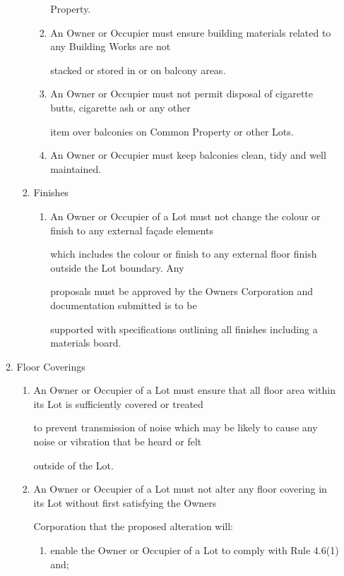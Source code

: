 \documentclass{article}
\begin{document}
\begin{enumerate}[label=\arabic*.]
\begin{enumerate}[label=\arabic{enumi}.\arabic*.]
\begin{enumerate}[label=(\arabic*)]
\begin{enumerate}[label=(\alph*)]
Property. 

\item  An Owner or Occupier must ensure building materials related to any Building Works are not 

stacked or stored in or on balcony areas. 

\item  An Owner or Occupier must not permit disposal of cigarette butts, cigarette ash or any other 

item over balconies on Common Property or other Lots. 

\item  An Owner or Occupier must keep balconies clean, tidy and well maintained. 

\end{enumerate}
\item  Finishes 

\begin{enumerate}[label=(\alph*)]
\item  An Owner or Occupier of a Lot must not change the colour or finish to any external façade elements 

which includes the colour or finish to any external floor finish outside the Lot boundary. Any 

proposals must be approved by the Owners Corporation and documentation submitted is to be 

supported with specifications outlining all finishes including a materials board. 

\end{enumerate}
\end{enumerate}
\item  Floor Coverings 

\begin{enumerate}[label=(\arabic*)]
\item  An Owner or Occupier of a Lot must ensure that all floor area within its Lot is sufficiently covered or treated 

to prevent transmission of noise which may be likely to cause any noise or vibration that be heard or felt 

outside of the Lot. 

\item  An Owner or Occupier of a Lot must not alter any floor covering in its Lot without first satisfying the Owners 

Corporation that the proposed alteration will: 

\begin{enumerate}[label=(\alph*)]
\item  enable the Owner or Occupier of a Lot to comply with Rule 4.6(1) and; 


\end{enumerate}
\end{enumerate}
\end{enumerate}
\end{enumerate}
\end{document}
